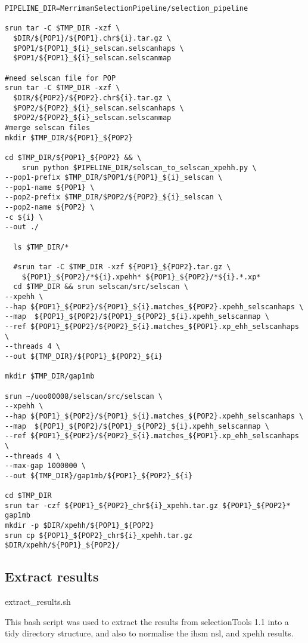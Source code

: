 \documentclass[]{report}
\begin{document}
\begin{appendices}
\begin{verbatim}
PIPELINE_DIR=MerrimanSelectionPipeline/selection_pipeline

srun tar -C $TMP_DIR -xzf \
  $DIR/${POP1}/${POP1}.chr${i}.tar.gz \
  $POP1/${POP1}_${i}_selscan.selscanhaps \
  $POP1/${POP1}_${i}_selscan.selscanmap

#need selscan file for POP
srun tar -C $TMP_DIR -xzf \
  $DIR/${POP2}/${POP2}.chr${i}.tar.gz \
  $POP2/${POP2}_${i}_selscan.selscanhaps \
  $POP2/${POP2}_${i}_selscan.selscanmap
#merge selscan files
mkdir $TMP_DIR/${POP1}_${POP2}

cd $TMP_DIR/${POP1}_${POP2} && \
    srun python $PIPELINE_DIR/selscan_to_selscan_xpehh.py \
--pop1-prefix $TMP_DIR/$POP1/${POP1}_${i}_selscan \
--pop1-name ${POP1} \
--pop2-prefix $TMP_DIR/$POP2/${POP2}_${i}_selscan \
--pop2-name ${POP2} \
-c ${i} \
--out ./
  
  ls $TMP_DIR/*
  
  #srun tar -C $TMP_DIR -xzf ${POP1}_${POP2}.tar.gz \
    ${POP1}_${POP2}/*${i}.xpehh* ${POP1}_${POP2}/*${i}.*.xp*
  cd $TMP_DIR && srun selscan/src/selscan \
--xpehh \
--hap ${POP1}_${POP2}/${POP1}_${i}.matches_${POP2}.xpehh_selscanhaps \
--map  ${POP1}_${POP2}/${POP1}_${POP2}_${i}.xpehh_selscanmap \
--ref ${POP1}_${POP2}/${POP2}_${i}.matches_${POP1}.xp_ehh_selscanhaps  \
--threads 4 \
--out ${TMP_DIR}/${POP1}_${POP2}_${i}

mkdir $TMP_DIR/gap1mb

srun ~/uoo00008/selscan/src/selscan \
--xpehh \
--hap ${POP1}_${POP2}/${POP1}_${i}.matches_${POP2}.xpehh_selscanhaps \
--map  ${POP1}_${POP2}/${POP1}_${POP2}_${i}.xpehh_selscanmap \
--ref ${POP1}_${POP2}/${POP2}_${i}.matches_${POP1}.xp_ehh_selscanhaps  \
--threads 4 \
--max-gap 1000000 \
--out ${TMP_DIR}/gap1mb/${POP1}_${POP2}_${i}

cd $TMP_DIR
srun tar -czf ${POP1}_${POP2}_chr${i}_xpehh.tar.gz ${POP1}_${POP2}* gap1mb
mkdir -p $DIR/xpehh/${POP1}_${POP2}
srun cp ${POP1}_${POP2}_chr${i}_xpehh.tar.gz $DIR/xpehh/${POP1}_${POP2}/
\end{verbatim}

\subsection{Extract results}\label{extract-results}

extract\_results.sh

This bash script was used to extract the results from selectionTools 1.1
into a tidy directory structure, and also to normalise the \gls{ihs}m
\gls{nsl}, and \gls{xpehh} results.


\end{appendices}
\end{document}
